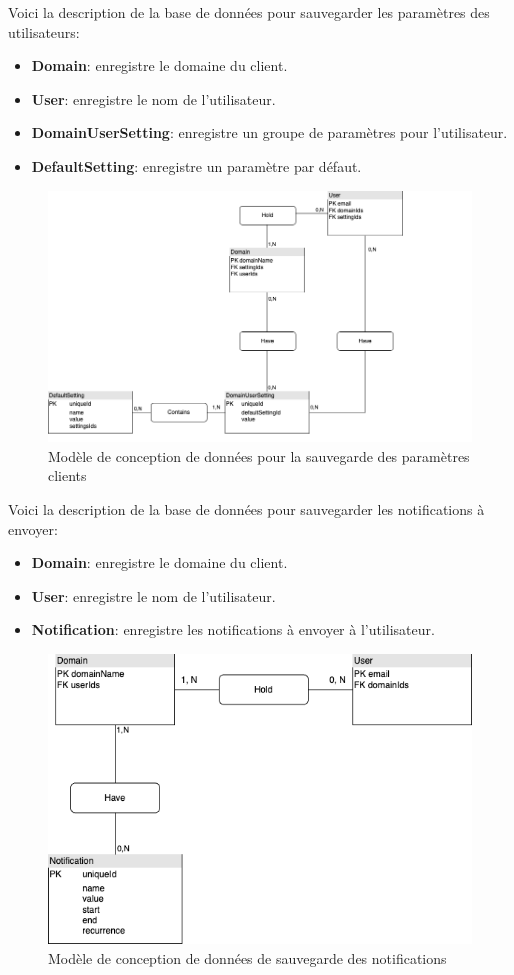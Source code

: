 \documentclass[a4paper, 11pt]{report}
\begin{document}
  Voici la description de la base de données pour sauvegarder les paramètres des utilisateurs:
  \begin{itemize}
    \item \textbf{Domain}: enregistre le domaine du client.
    \item \textbf{User}: enregistre le nom de l'utilisateur.
    \item \textbf{DomainUserSetting}: enregistre un groupe de paramètres pour l'utilisateur.
    \item \textbf{DefaultSetting}: enregistre un paramètre par défaut.
  \end{itemize}
  \begin{figure}[H]
      \centering
      \includegraphics[scale=0.40,center]{schemas/settings-mcd-kingcandy.png}
      \caption{Modèle de conception de données pour la sauvegarde des paramètres clients}
  \end{figure}
  Voici la description de la base de données pour sauvegarder les notifications à envoyer:
  \begin{itemize}
    \item \textbf{Domain}: enregistre le domaine du client.
    \item \textbf{User}: enregistre le nom de l'utilisateur.
    \item \textbf{Notification}: enregistre les notifications à envoyer à l'utilisateur.
  \end{itemize}
  \begin{figure}[H]
      \centering
      \includegraphics[scale=0.40,center]{schemas/notifications-mcd-calhoun.png}
      \caption{Modèle de conception de données de sauvegarde des notifications}
  \end{figure}
\end{document}
